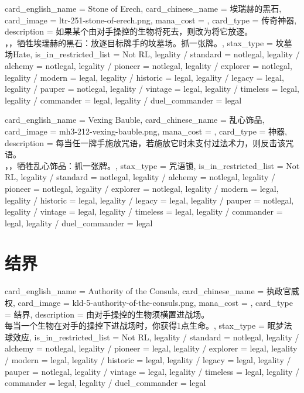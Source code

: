 \documentclass[lang = cn, color = black, 10pt]{AllThatStax}
\begin{document}
\card
{
	card_english_name = {Stone of Erech},
	card_chinese_name = {埃瑞赫的黑石},
	card_image = ltr-251-stone-of-erech.png,
	mana_cost = ,
	card_type = 传奇神器,
	description = {如果某个由对手操控的生物将死去，则改为将它放逐。\\
		，，牺牲埃瑞赫的黑石：放逐目标牌手的坟墓场。抓一张牌。},
	stax_type = 坟墓场Hate,
	is_in_restricted_list = Not RL,
	legality / standard = notlegal,
	legality / alchemy = notlegal,
	legality / pioneer = notlegal,
	legality / explorer = notlegal,
	legality / modern = legal,
	legality / historic = legal,
	legality / legacy = legal,
	legality / pauper = notlegal,
	legality / vintage = legal,
	legality / timeless = legal,
	legality / commander = legal,
	legality / duel_commander = legal
}

\card
{
	card_english_name = {Vexing Bauble},
	card_chinese_name = {乱心饰品},
	card_image = mh3-212-vexing-bauble.png,
	mana_cost = ,
	card_type = 神器,
	description = {每当任一牌手施放咒语，若施放它时未支付过法术力，则反击该咒语。\\
		，，牺牲乱心饰品：抓一张牌。},
	stax_type = 咒语锁,
	is_in_restricted_list = Not RL,
	legality / standard = notlegal,
	legality / alchemy = notlegal,
	legality / pioneer = notlegal,
	legality / explorer = notlegal,
	legality / modern = legal,
	legality / historic = legal,
	legality / legacy = legal,
	legality / pauper = notlegal,
	legality / vintage = legal,
	legality / timeless = legal,
	legality / commander = legal,
	legality / duel_commander = legal
}

\section{结界}

\card
{
	card_english_name = {Authority of the Consuls},
	card_chinese_name = {执政官威权},
	card_image = kld-5-authority-of-the-consuls.png,
	mana_cost = ,
	card_type = 结界,
	description = {由对手操控的生物须横置进战场。\\
		每当一个生物在对手的操控下进战场时，你获得1点生命。},
	stax_type = 眠梦法球效应,
	is_in_restricted_list = Not RL,
	legality / standard = notlegal,
	legality / alchemy = notlegal,
	legality / pioneer = legal,
	legality / explorer = legal,
	legality / modern = legal,
	legality / historic = legal,
	legality / legacy = legal,
	legality / pauper = notlegal,
	legality / vintage = legal,
	legality / timeless = legal,
	legality / commander = legal,
	legality / duel_commander = legal
}
\end{document}

